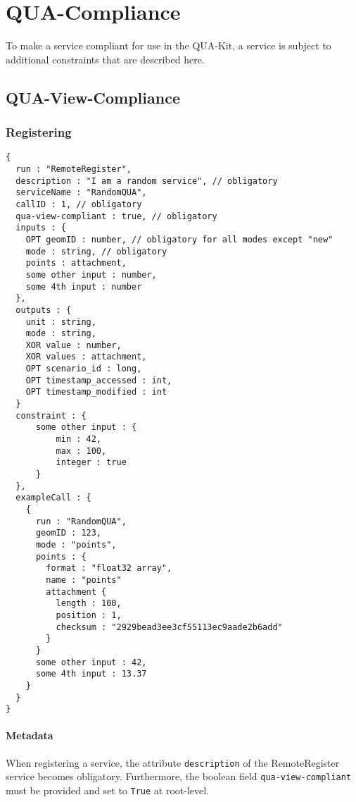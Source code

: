 \section{QUA-Compliance}
\label{ch:quacompliance}

To make a service compliant for use in the QUA-Kit, a service is subject to additional constraints that are described here.

\subsection{QUA-View-Compliance}

\subsubsection{Registering}

\begin{lstlisting}[caption={Registering a QUA-compliant service}, label={lst:quacompliance}]
{
  run : "RemoteRegister",
  description : "I am a random service", // obligatory
  serviceName : "RandomQUA",
  callID : 1, // obligatory
  qua-view-compliant : true, // obligatory
  inputs : {
    OPT geomID : number, // obligatory for all modes except "new"
    mode : string, // obligatory
    points : attachment,
    some other input : number,
    some 4th input : number
  },
  outputs : {
    unit : string,
    mode : string,
    XOR value : number,
    XOR values : attachment,
    OPT scenario_id : long,
    OPT timestamp_accessed : int,
    OPT timestamp_modified : int
  }
  constraint : {
      some other input : {
          min : 42,
          max : 100,
          integer : true
      }
  },
  exampleCall : {
    {
      run : "RandomQUA",
      geomID : 123,
      mode : "points",
      points : {
        format : "float32 array",
        name : "points"
        attachment {
          length : 100,
          position : 1,
          checksum : "2929bead3ee3cf55113ec9aade2b6add"
        }
      }
      some other input : 42,
      some 4th input : 13.37
    }
  }
}
\end{lstlisting}

\paragraph{Metadata}
When registering a service, the attribute \texttt{description} of the RemoteRegister service becomes obligatory. Furthermore, the boolean field \texttt{qua-view-compliant} must be provided and set to \texttt{True} at root-level.

